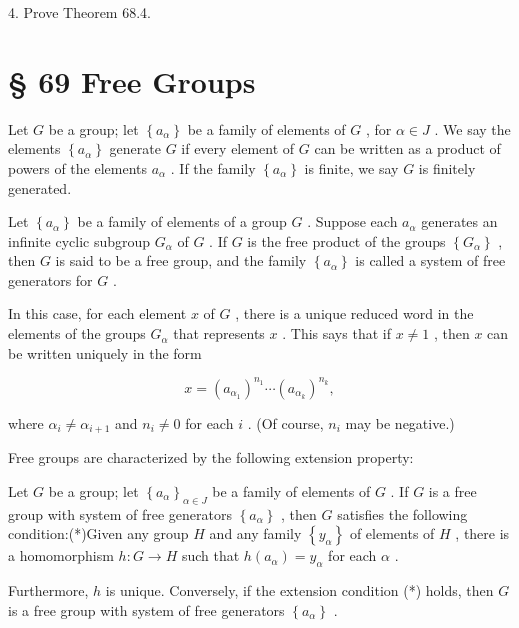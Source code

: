 4. Prove Theorem 68.4.

\section*{§ 69 Free Groups}

Let \(G\) be a group; let \(\left\{  {a}_{\alpha }\right\}\) be a family of elements of \(G\) , for \(\alpha  \in  J\) . We say the elements \(\left\{  {a}_{\alpha }\right\}\) generate \(G\) if every element of \(G\) can be written as a product of powers of the elements \({a}_{\alpha }\) . If the family \(\left\{  {a}_{\alpha }\right\}\) is finite, we say \(G\) is finitely generated.

\begin{definition} Let \(\left\{  {a}_{\alpha }\right\}\) be a family of elements of a group \(G\) . Suppose each \({a}_{\alpha }\) generates an infinite cyclic subgroup \({G}_{\alpha }\) of \(G\) . If \(G\) is the free product of the groups \(\left\{  {G}_{\alpha }\right\}\) , then \(G\) is said to be a free group, and the family \(\left\{  {a}_{\alpha }\right\}\) is called a system of free generators for \(G\) .
\end{definition}

In this case, for each element \(x\) of \(G\) , there is a unique reduced word in the elements of the groups \({G}_{\alpha }\) that represents \(x\) . This says that if \(x \neq  1\) , then \(x\) can be written uniquely in the form

\[
x = {\left( {a}_{{\alpha }_{1}}\right) }^{{n}_{1}}\cdots {\left( {a}_{{\alpha }_{k}}\right) }^{{n}_{k}},
\]

where \({\alpha }_{i} \neq  {\alpha }_{i + 1}\) and \({n}_{i} \neq  0\) for each \(i\) . (Of course, \({n}_{i}\) may be negative.)

Free groups are characterized by the following extension property:

\begin{lemma} Let \(G\) be a group; let \({\left\{  {a}_{\alpha }\right\}  }_{\alpha  \in  J}\) be a family of elements of \(G\) . If \(G\) is a free group with system of free generators \(\left\{  {a}_{\alpha }\right\}\) , then \(G\) satisfies the following condition:(*)Given any group \(H\) and any family \(\left\{  {y}_{\alpha }\right\}\) of elements of \(H\) , there is a homomorphism \(h : G \rightarrow  H\) such that \(h\left( {a}_{\alpha }\right)  = {y}_{\alpha }\) for each \(\alpha\) .

Furthermore, \(h\) is unique. Conversely, if the extension condition (*) holds, then \(G\) is a free group with system of free generators \(\left\{  {a}_{\alpha }\right\}\) .
\end{lemma}

